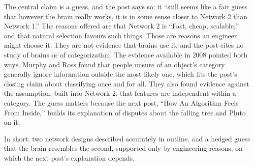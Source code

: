\begin{afterword}
The central claim is a guess, and the post says so: it ``still seems like a fair guess that however the brain really works, it is in some sense closer to Network 2 than Network 1.'' The reasons offered are that Network 2 is ``Fast, cheap, scalable,'' and that natural selection favours such things. Those are reasons an engineer might choose it. They are not evidence that brains use it, and the post cites no study of brains or of categorization. The evidence available in 2008 pointed both ways. Murphy and Ross found that people unsure of an object's category generally ignore information outside the most likely one, which fits the post's closing claim about classifying once and for all. They also found evidence against the assumption, built into Network 2, that features are independent within a category. The guess matters because the next post, ``How An Algorithm Feels From Inside,'' builds its explanation of disputes about the falling tree and Pluto on it.

In short: two network designs described accurately in outline, and a hedged guess that the brain resembles the second, supported only by engineering reasons, on which the next post's explanation depends.
\end{afterword}
